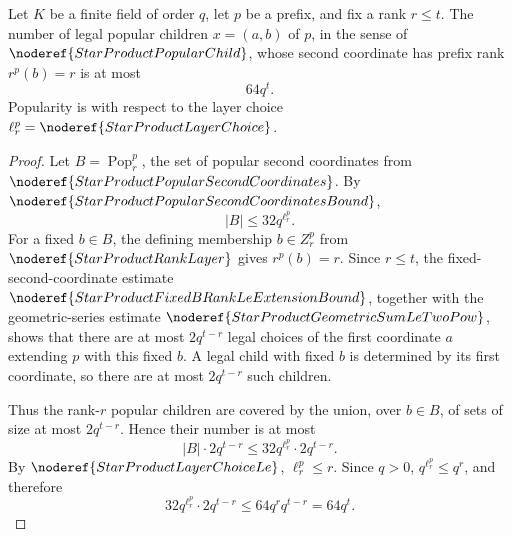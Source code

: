 \begin{helper}
Let \(K\) be a finite field of order \(q\), let \(p\) be a prefix, and fix a
rank \(r\le t\).  The number of legal popular children \(x=(a,b)\) of \(p\),
in the sense of \(\noderef{StarProductPopularChild}\),
whose second coordinate has prefix rank \(r^p(b)=r\) is at most
\[
  64q^t .
\]
Popularity is with respect to the layer choice
\(\ell^p_r=\noderef{StarProductLayerChoice}\).
\end{helper}
\begin{proof}
Let \(B=\operatorname{Pop}^p_r\), the set of popular second coordinates from
\(\noderef{StarProductPopularSecondCoordinates}\).  By
\(\noderef{StarProductPopularSecondCoordinatesBound}\),
\[
  |B|\le 32q^{\ell^p_r}.
\]
For a fixed \(b\in B\), the defining membership \(b\in Z^p_r\) from
\(\noderef{StarProductRankLayer}\) gives \(r^p(b)=r\).  Since \(r\le t\),
the fixed-second-coordinate estimate
\(\noderef{StarProductFixedBRankLeExtensionBound}\), together with the
geometric-series estimate \(\noderef{StarProductGeometricSumLeTwoPow}\),
shows that there are at most \(2q^{t-r}\) legal choices of the first
coordinate \(a\) extending \(p\) with this fixed \(b\).  A legal child with
fixed \(b\) is determined by its first coordinate, so there are at most
\(2q^{t-r}\) such children.

Thus the rank-\(r\) popular children are covered by the union, over
\(b\in B\), of sets of size at most \(2q^{t-r}\).  Hence their number is at
most
\[
  |B|\cdot 2q^{t-r}
  \le 32q^{\ell^p_r}\cdot 2q^{t-r}.
\]
By \(\noderef{StarProductLayerChoiceLe}\), \(\ell^p_r\le r\).  Since
\(q>0\), \(q^{\ell^p_r}\le q^r\), and therefore
\[
  32q^{\ell^p_r}\cdot 2q^{t-r}
  \le 64q^r q^{t-r}
  =64q^t.
\]
\end{proof}
